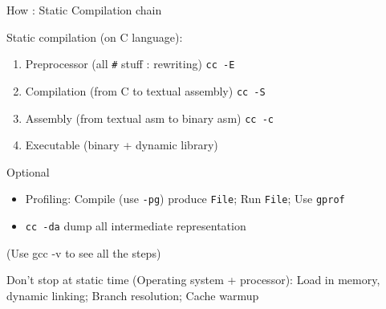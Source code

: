 \begin{Frame}{How : Static Compilation chain}

  \begin{block}{Static compilation (on C language):}
    
    \begin{enumerate}
    \item Preprocessor (all \texttt{\#} stuff : rewriting) \hfill \texttt{cc -E}
    \item Compilation (from C to textual assembly) \hfill \texttt{cc -S}
    \item Assembly    (from textual asm to binary asm) \hfill \texttt{cc -c}
    \item Executable  (binary + dynamic library)
    \end{enumerate}

  \end{block}
  \begin{block}{Optional}
    \begin{itemize}
    \item Profiling: Compile (use \texttt{-pg}) produce \texttt{File}; Run
      \texttt{File}; Use \texttt{gprof}
    \item \texttt{cc -da} dump all intermediate representation
    \end{itemize}
  \end{block}
    (Use gcc -v to see all the steps)
    
    Don't stop at static time (Operating system + processor): Load in
    memory, dynamic linking;  Branch resolution; Cache warmup

\end{Frame}


